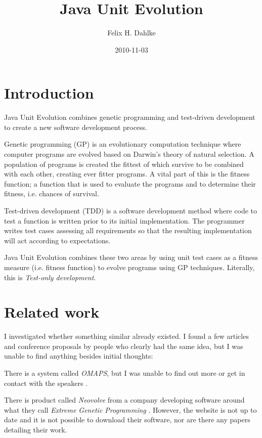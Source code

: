\documentclass[a4paper]{article}
\title{Java Unit Evolution}
\author{Felix H. Dahlke}
\date{2010-11-03}
\begin{document}
\maketitle

\tableofcontents
\pagebreak

\section{Introduction}

Java Unit Evolution combines genetic programming and test-driven
development to create a new software development process.

Genetic programming (GP) is an evolutionary computation technique
where computer programs are evolved based on Darwin's theory of
natural selection.  A population of programs is created the fittest of
which survive to be combined with each other, creating ever fitter
programs. A vital part of this is the fitness function; a function
that is used to evaluate the programs and to determine their fitness,
i.e. chances of survival.

Test-driven development (TDD) is a software development method where
code to test a function is written prior to its initial
implementation. The programmer writes test cases assessing all
requirements so that the resulting implementation will act according
to expectations.

Java Unit Evolution combines these two areas by using unit test cases
as a fitness measure (i.e. fitness function) to evolve programs using
GP techniques. Literally, this is \emph{Test-only development}.

\section{Related work}

I investigated whether something similar already existed. I found a
few articles and conference proposals by people who clearly had the
same idea, but I was unable to find anything besides initial thoughts:

There is a system called \emph{OMAPS}, but I was unable to find out
more or get in contact with the speakers \cite{robertsetal2009}.

There is product called \emph{Neovolve} from a company developing
software around what they call \emph{Extreme Genetic Programming}
\cite{neocoretechs2003}. However, the website is not up to date and it
is not possible to download their software, nor are there any papers
detailing their work.
\end{document}
